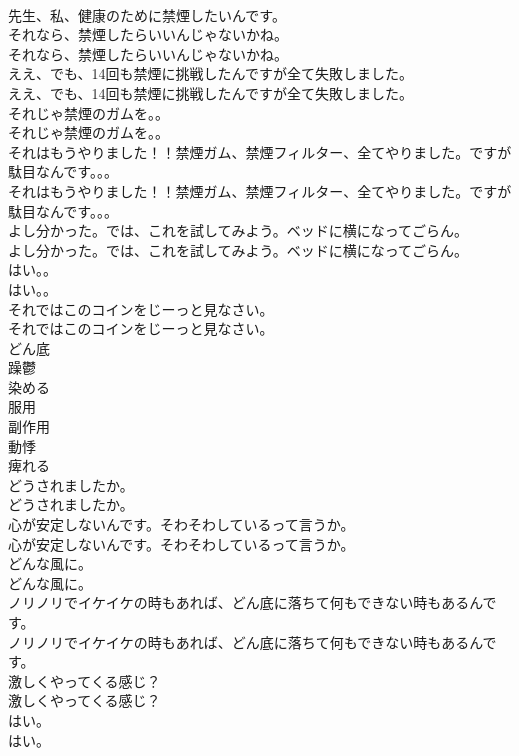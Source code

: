 \documentclass[8pt]{extreport}
\begin{document}
\begin{CJK}{UTF8}{min}
\\	先生、私、健康のために禁煙したいんです。 
\\	それなら、禁煙したらいいんじゃないかね。	
\\	それなら、禁煙したらいいんじゃないかね。 
\\	ええ、でも、14回も禁煙に挑戦したんですが全て失敗しました。	
\\	ええ、でも、14回も禁煙に挑戦したんですが全て失敗しました。 
\\	それじゃ禁煙のガムを。。	
\\	それじゃ禁煙のガムを。。 
\\	それはもうやりました！！禁煙ガム、禁煙フィルター、全てやりました。ですが駄目なんです。。。	
\\	それはもうやりました！！禁煙ガム、禁煙フィルター、全てやりました。ですが駄目なんです。。。 
\\	よし分かった。では、これを試してみよう。ベッドに横になってごらん。	
\\	よし分かった。では、これを試してみよう。ベッドに横になってごらん。 
\\	はい。。	
\\	はい。。 
\\	それではこのコインをじーっと見なさい。	
\\	それではこのコインをじーっと見なさい。 
\\	どん底
\\	躁鬱
\\	染める
\\	服用
\\	副作用
\\	動悸
\\	痺れる
\\	どうされましたか。	
\\	どうされましたか。 
\\	心が安定しないんです。そわそわしているって言うか。	
\\	心が安定しないんです。そわそわしているって言うか。 
\\	どんな風に。	
\\	どんな風に。 
\\	ノリノリでイケイケの時もあれば、どん底に落ちて何もできない時もあるんです。	
\\	ノリノリでイケイケの時もあれば、どん底に落ちて何もできない時もあるんです。 
\\	激しくやってくる感じ？	
\\	激しくやってくる感じ？ 
\\	はい。	
\\	はい。 

\end{CJK}
\end{document}
